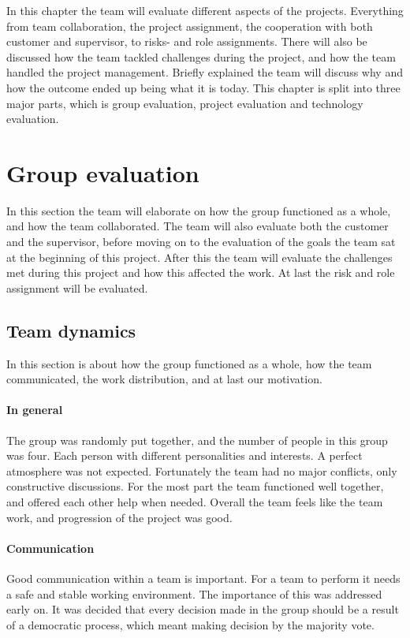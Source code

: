 In this chapter the team will evaluate different aspects of the projects. 
Everything from team collaboration, the project assignment, the cooperation with both customer and supervisor, to risks- and role assignments. There will also be discussed how the team tackled challenges during the project, and how the team handled the project management. Briefly explained the team will discuss why and how the outcome ended up being what it is today.
This chapter is split into three major parts, which is group evaluation, project evaluation and technology evaluation. 

\section{Group evaluation}
In this section the team will elaborate on how the group functioned as a whole, and how the team collaborated. The team will also evaluate both the customer and the supervisor, before moving on to the evaluation of the goals the team sat at the beginning of this project. After this the team will evaluate the challenges met during this project and how this affected the work. At last the risk and role assignment will be evaluated.

\subsection{Team dynamics}
In this section is about how the group functioned as a whole, how the team communicated, the work distribution, and at last our motivation.

\paragraph{In general}
The group was randomly put together, and the number of people in this group was four.
Each person with different personalities and interests. A perfect atmosphere was not expected. Fortunately the team had no major conflicts, only constructive discussions. For the most part the team functioned well together, and offered each other help when needed. 
Overall the team feels like the team work, and progression of the project was good.

\paragraph{Communication}
Good communication within a team is important. For a team to perform it needs a safe and stable working environment. The importance of this was addressed early on. 
It was decided that every decision made in the group should be a result of a democratic process, which meant making decision by the majority vote. 

